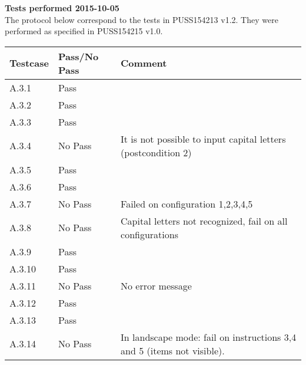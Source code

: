 \renewcommand{\testdate}{2015-10-05}
\textbf{ Tests performed \testdate} \\
The protocol below correspond to the tests in PUSS154213 v1.2. They were performed as specified in PUSS154215 v1.0.
\begin{center}
  	\begin{tabular}{| p{3cm} | p{5cm} | p{5cm} |}
    		\hline
	    	\textbf{Testcase}			& \textbf{Pass/No Pass} 	& \textbf{Comment} \\ \hline
    		A.3.1		 					& Pass  							&  				\\ \hline
    		A.3.2		 					& Pass 							& 				 \\	\hline
    		A.3.3		 					& Pass 							& 				 \\	\hline
    		A.3.4		 					& No Pass 					& It is not possible to input capital letters (postcondition 2)				 \\	\hline
    		A.3.5		 					& Pass 							& 				 \\	\hline
    		A.3.6		 					& Pass 							& 				 \\	\hline
    		A.3.7		 					& No Pass 							& Failed on configuration 1,2,3,4,5				 \\	\hline
    		A.3.8		 					& No Pass 							& Capital letters not recognized, fail on all configurations				 \\	\hline
    		A.3.9		 					& Pass 							& 				 \\	\hline
    		A.3.10	 						& Pass 							& 				 \\	\hline
    		A.3.11	 						& No Pass 							& No error message				 \\	\hline
    		A.3.12	 						& Pass 							& 				 \\	\hline
    		A.3.13	 						& Pass						& 				 \\	\hline
    		A.3.14	 						& No Pass 							& In landscape mode: fail on instructions 3,4 and 5 (items not visible).   				 \\	\hline
 	\end{tabular}
\end{center}